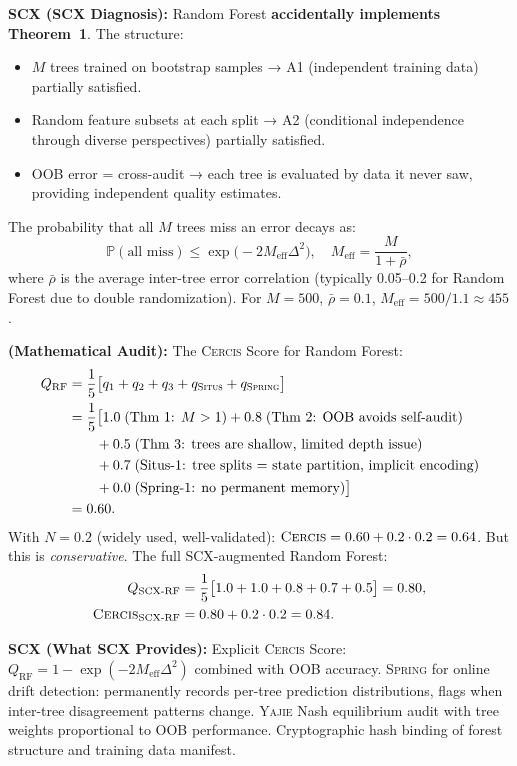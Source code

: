 \documentclass[12pt,a4paper]{article}
\theoremstyle{definition}
\newcommand{\Situs}{\textsc{Situs}}
\newcommand{\Yajie}{\textsc{Yajie}}
\newcommand{\Spring}{\textsc{Spring}}
\newcommand{\Cercis}{\textsc{Cercis}}
\newcommand{\Pbb}{\mathbb{P}}
\newcommand{\whatMissing}{\noindent\textbf{SCX (What SCX Provides):} }
\newcommand{\diagnosis}{\noindent\textbf{SCX (SCX Diagnosis):} }
\newcommand{\mathAudit}{\noindent\textbf{ (Mathematical Audit):} }
\begin{document}
\diagnosis{} Random Forest \textbf{accidentally implements Theorem~1}. The structure:
\begin{itemize}[nosep]
    \item $M$ trees trained on bootstrap samples → A1 (independent training data) partially satisfied.
    \item Random feature subsets at each split → A2 (conditional independence through diverse perspectives) partially satisfied.
    \item OOB error = cross-audit → each tree is evaluated by data it never saw, providing independent quality estimates.
\end{itemize}
The probability that all $M$ trees miss an error decays as:
\[
\Pbb(\text{all miss}) \le \exp\bigl(-2M_{\text{eff}}\Delta^2\bigr), \quad M_{\text{eff}} = \frac{M}{1 + \bar{\rho}},
\]
where $\bar{\rho}$ is the average inter-tree error correlation (typically 0.05--0.2 for Random Forest due to double randomization). For $M=500$, $\bar{\rho}=0.1$, $M_{\text{eff}} = 500/1.1 \approx 455$.

\mathAudit{} The \Cercis{} Score for Random Forest:
\begin{align}
    Q_{\text{RF}} &= \frac{1}{5}\bigl[q_1 + q_2 + q_3 + q_{\Situs} + q_{\Spring}\bigr] \\
    &= \frac{1}{5}\bigl[1.0\;(\text{Thm 1: } M>1) + 0.8\;(\text{Thm 2: OOB avoids self-audit}) \\
    &\qquad + 0.5\;(\text{Thm 3: trees are shallow, limited depth issue}) \\
    &\qquad + 0.7\;(\text{Situs-1: tree splits = state partition, implicit encoding}) \\
    &\qquad + 0.0\;(\text{Spring-1: no permanent memory})\bigr] \\
    &= 0.60.
\end{align}
With $N=0.2$ (widely used, well-validated): $\Cercis = 0.60 + 0.2 \cdot 0.2 = 0.64$. But this is \textit{conservative}. The full SCX-augmented Random Forest:
\begin{align}
    Q_{\text{SCX-RF}} &= \frac{1}{5}\bigl[1.0 + 1.0 + 0.8 + 0.7 + 0.5\bigr] = 0.80, \\
    \Cercis_{\text{SCX-RF}} &= 0.80 + 0.2 \cdot 0.2 = 0.84.
\end{align}

\whatMissing{} Explicit \Cercis{} Score: $Q_{\text{RF}} = 1 - \exp(-2M_{\text{eff}}\Delta^2)$ combined with OOB accuracy. \Spring{} for online drift detection: permanently records per-tree prediction distributions, flags when inter-tree disagreement patterns change. \Yajie{} Nash equilibrium audit with tree weights proportional to OOB performance. Cryptographic hash binding of forest structure and training data manifest.
\end{document}
